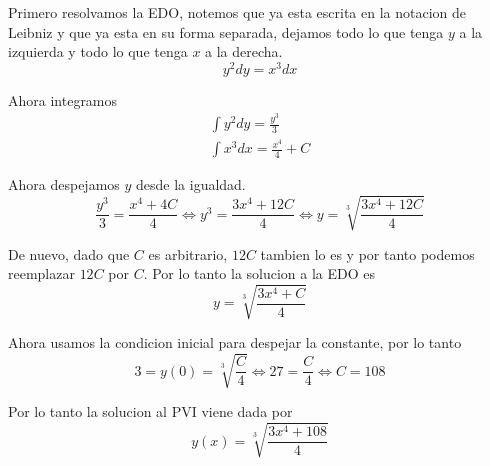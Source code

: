 \documentclass[a4paper,oneside,10.5pt]{article}
\begin{document}
\begin{sol}
  Primero resolvamos la EDO, notemos que ya esta escrita en la notacion de Leibniz y que ya esta en su forma
  separada, dejamos todo lo que tenga $y$ a la izquierda y todo lo que tenga $x$ a la derecha.
  \begin{equation*}
    y^{2} dy = x^{3} dx
  \end{equation*}

  Ahora integramos
  \begin{gather*}
    \int y^{2} dy = \frac{y^{3}}{3}\\
    \int x^{3} dx = \frac{x^{4}}{4} + C
  \end{gather*}

  Ahora despejamos $y$ desde la igualdad.
  \begin{equation*}
    \frac{y^{3}}{3} = \frac{x^{4} + 4C}{4} \iff y^{3} = \frac{3x^{4} + 12C}{4} \iff y = \sqrt[3]{\frac{3x^{4} + 12C}{4}}
  \end{equation*}

  De nuevo, dado que $C$ es arbitrario, $12C$ tambien lo es y por tanto podemos reemplazar $12C$ por $C$. Por lo tanto la solucion a la EDO es
  \begin{equation*}
    y = \sqrt[3]{\frac{3x^{4} + C}{4}}
  \end{equation*}

  Ahora usamos la condicion inicial para despejar la constante, por lo tanto
  \begin{equation*}
    3 = y(0) = \sqrt[3]{\frac{C}{4}} \iff 27 = \frac{C}{4} \iff C = 108
  \end{equation*}

  Por lo tanto la solucion al PVI viene dada por
  \begin{equation*}
    y(x) = \sqrt[3]{\frac{3x^{4} + 108}{4}}
  \end{equation*}
\end{sol}
\end{document}
